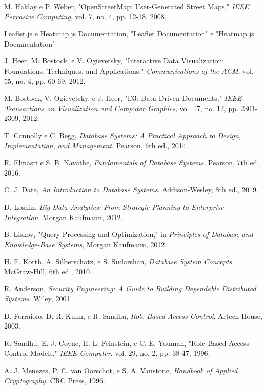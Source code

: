 \begin{thebibliography}{99}
M. Haklay e P. Weber, "OpenStreetMap: User-Generated Street Maps," \textit{IEEE Pervasive Computing}, vol. 7, no. 4, pp. 12-18, 2008.

Leaflet.js e Heatmap.js Documentation, "Leaflet Documentation" e "Heatmap.js Documentation"

J. Heer, M. Bostock, e V. Ogievetsky, "Interactive Data Visualization: Foundations, Techniques, and Applications," \textit{Communications of the ACM}, vol. 55, no. 4, pp. 60-69, 2012.

M. Bostock, V. Ogievetsky, e J. Heer, "D3: Data-Driven Documents," \textit{IEEE Transactions on Visualization and Computer Graphics}, vol. 17, no. 12, pp. 2301-2309, 2012.

T. Connolly e C. Begg, \textit{Database Systems: A Practical Approach to Design, Implementation, and Management}. Pearson, 6th ed., 2014.

R. Elmasri e S. B. Navathe, \textit{Fundamentals of Database Systems}. Pearson, 7th ed., 2016.

C. J. Date, \textit{An Introduction to Database Systems}. Addison-Wesley, 8th ed., 2019.

D. Loshin, \textit{Big Data Analytics: From Strategic Planning to Enterprise Integration}. Morgan Kaufmann, 2012.

B. Liskov, "Query Processing and Optimization," in \textit{Principles of Database and Knowledge-Base Systems}, Morgan Kaufmann, 2012.

H. F. Korth, A. Silberschatz, e S. Sudarshan, \textit{Database System Concepts}. McGraw-Hill, 6th ed., 2010.

R. Anderson, \textit{Security Engineering: A Guide to Building Dependable Distributed Systems}. Wiley, 2001.

D. Ferraiolo, D. R. Kuhn, e R. Sandhu, \textit{Role-Based Access Control}. Artech House, 2003.

R. Sandhu, E. J. Coyne, H. L. Feinstein, e C. E. Youman, "Role-Based Access Control Models," \textit{IEEE Computer}, vol. 29, no. 2, pp. 38-47, 1996.

A. J. Menezes, P. C. van Oorschot, e S. A. Vanstone, \textit{Handbook of Applied Cryptography}. CRC Press, 1996.


\end{thebibliography}
